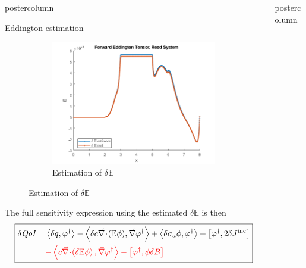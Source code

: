 \documentclass[xcolor={usenames,dvipsnames,svgnames,table}]{beamer}
\newcommand{\bra}{\left\langle}
\newcommand{\ket}{\right\rangle}
\newcommand{\sbra}{\left[}
\newcommand{\sket}{\right]}
\newcommand{\Edd}{\mathbb{E}}
\newcommand{\BEdd}{B}
\newcommand{\isigt}{c}
\newcommand{\qoi}{{\it QoI}\xspace}
\newcommand{\tcr}[1]{\textcolor{red}{#1}}
\newlength{\columnheight}
\begin{document}
\begin{frame}
\begin{columns}
\begin{column}{.33\textwidth}
\begin{beamercolorbox}[center,wd=\textwidth]{postercolumn}
\begin{minipage}[T]{0.95\textwidth}
{\begin{block}{Eddington estimation}
\begin{figure}[H]
\begin{subfigure}{.33\textwidth}
  \includegraphics[width=.98\linewidth]{posterfigures/7deltaE.png}
    \caption{Estimation of $\delta \Edd$}
  \label{fig:sfig5}
\end{subfigure}%
\label{fig:fig}
\end{figure}		    

The full sensitivity expression using the estimated $\delta \Edd$ is then
\begin{equation}
\label{SensIP3}
\boxed{
\begin{split}
\delta \qoi =&  \bra \delta q , \varphi^\dag \ket - \bra \delta \isigt \div (\Edd \phi), \grad \varphi^\dag \ket + \bra \delta \sigma_a \phi, \varphi^\dag \ket + \sbra \varphi^\dag, 2 \delta J^{\text{inc}} \sket \\
& \tcr{ - \bra  \isigt \div \left( \delta \Edd \phi \right), \grad \varphi^\dag \ket
- \sbra \varphi^\dag, \phi \delta \BEdd \sket}
\end{split}
}
\end{equation}	 
		    	\vfill
			    \end{block}
			    \vfill
			}
			\end{minipage}
		\end{beamercolorbox}
	\end{column}

	\begin{column}{.33\textwidth}
		\begin{beamercolorbox}[center,wd=\textwidth]{postercolumn}
			\begin{minipage}[T]{0.95\textwidth} %
			\parbox[t][\columnheight]{\textwidth}{ %

}
\end{minipage}
\end{beamercolorbox}
\end{column}
\end{columns}
\end{frame}
\end{document}
